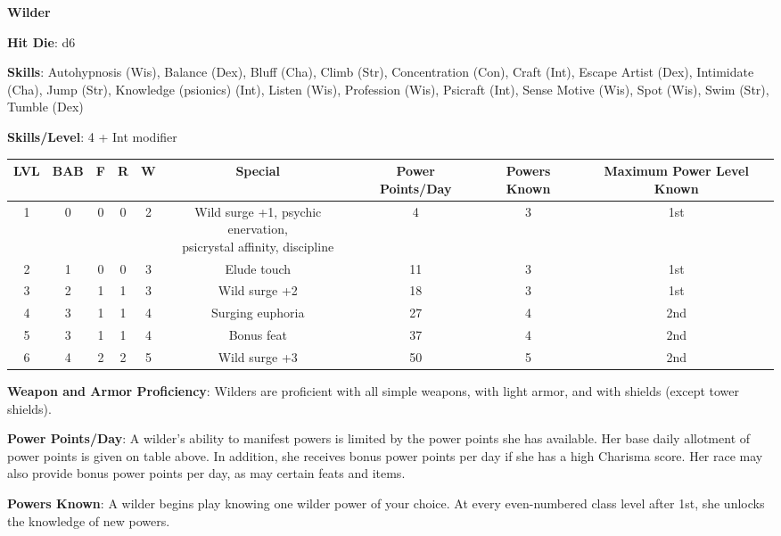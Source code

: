 \textbf{\huge{Wilder}}

\textbf{Hit Die}: d6

\textbf{Skills}: Autohypnosis (Wis), Balance (Dex), Bluff (Cha), Climb (Str), Concentration (Con), Craft (Int), Escape Artist (Dex), Intimidate (Cha), Jump (Str), Knowledge (psionics) (Int), Listen (Wis), Profession (Wis), Psicraft (Int), Sense Motive (Wis), Spot (Wis), Swim (Str), Tumble (Dex)

\textbf{Skills/Level}: 4 + Int modifier

\begin{center}
\begin{adjustwidth}{-4cm}{}
\begin{small}
\begin{tabular}{| c | c | c | c | c | c | c | c | c |}
\hline
LVL &BAB &F &R &W &Special &Power Points/Day &Powers Known &Maximum Power Level Known \\
\hline
1 &0 &0 &0 &2 &\makecell{Wild surge +1, psychic enervation,\\ psicrystal affinity, discipline} &4 &3 &1st \\
2 &1 &0 &0 &3 &Elude touch &11 &3 &1st \\
3 &2 &1 &1 &3 &Wild surge +2 &18 &3 &1st \\
4 &3 &1 &1 &4 &Surging euphoria &27 &4 &2nd \\
5 &3 &1 &1 &4 &Bonus feat &37 &4 &2nd \\
6 &4 &2 &2 &5 &Wild surge +3 &50 &5 &2nd \\
\hline
\end{tabular}
\end{small}
\end{adjustwidth}
\end{center}

\textbf{Weapon and Armor Proficiency}: Wilders are proficient with all simple weapons, with light armor, and with shields (except tower shields).

\textbf{Power Points/Day}: A wilder’s ability to manifest powers is limited by the power points she has available. Her base daily allotment of power points is given on table above. In addition, she receives bonus power points per day if she has a high Charisma score. Her race may also provide bonus power points per day, as may certain feats and items.

\textbf{Powers Known}: A wilder begins play knowing one wilder power of your choice. At every even-numbered class level after 1st, she unlocks the knowledge of new powers.

